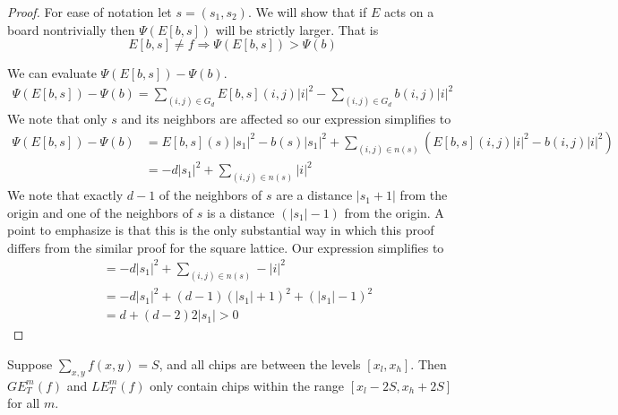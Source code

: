 \documentclass[runningheads,a4paper]{llncs}
\begin{document}
\begin{proof}
For ease of notation let $s=(s_1, s_2)$. We will show that if $E$ acts on a board nontrivially then $\Psi(E[b, s])$ will be strictly larger. That is  
\begin{equation}
E[b, s] \neq f \Rightarrow \Psi(E[b, s]) > \Psi(b)
\end{equation}


We can evaluate $\Psi(E[b, s]) - \Psi(b)$.
\begin{align}
\Psi(E[b, s])-\Psi(b) = \sum_{(i,j) \in G_d} E[b, s](i,j)|i|^2 - \sum_{(i,j) \in G_d} b(i,j)|i|^2 
\end{align}
We note that only $s$ and its neighbors are affected so our expression simplifies to
\begin{align*}
\Psi(E[b, s]) - \Psi(b) &= E[b, s](s) |s_1|^2 - b(s) |s_1|^2 + \sum_{(i,j) \in n(s)} (E[b,s](i,j) |i|^2 - b(i,j)|i|^2) \\
&= -d |s_1|^2 + \sum_{(i,j) \in n(s)} |i|^2
\end{align*}
We note that exactly $d-1$ of the neighbors of $s$ are a distance $|s_1 +1|$ from the origin and one of the neighbors of $s$ is a distance $(|s_1| - 1)$ from the origin.  A point to emphasize is that this is the only substantial way in which this proof differs from the similar proof for the square lattice. Our expression simplifies to 
\begin{align*}
&= -d |s_1|^2 + \sum_{(i,j) \in n(s)}-|i|^2 \\
&= - d|s_1|^2 + (d-1)(|s_1| +1)^2 +(|s_1| -1)^2 \\
&= d + (d-2)2|s_1| >0
\end{align*}
\end{proof}

\begin{lemma}
\label{finiteextensiontree}
Suppose $\sum_{x,y} f(x,y) = S$, and all chips are between the levels $[x_l, x_h]$. Then $GE_T^m(f)$ and $LE_T^m(f)$ only contain chips within the range $[x_l - 2S, x_h + 2S]$ for all $m$.
\end{lemma}
\end{document}
